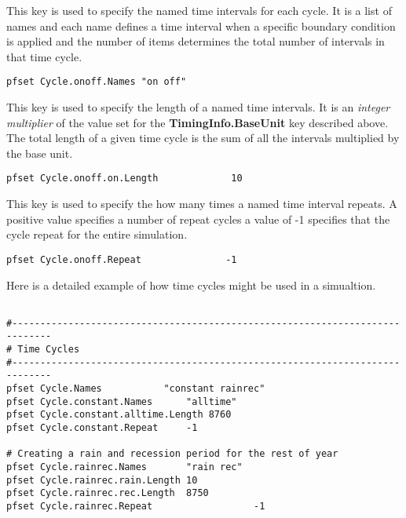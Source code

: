 {
This key is used to specify the named time intervals for each cycle.  It is a list of names and each name defines a time interval when a specific boundary condition is applied and the number of items determines the total number of intervals in that time cycle.
}
\begin{display}\begin{verbatim}
pfset Cycle.onoff.Names "on off"
\end{verbatim}\end{display}

{
This key is used to specify the length of a named time intervals.  It is an {\em integer multiplier} of the value set for the {\bf TimingInfo.BaseUnit} key described above. The total length of a given time cycle is the sum of all the intervals multiplied by the base unit.
}
\begin{display}\begin{verbatim}
pfset Cycle.onoff.on.Length             10
\end{verbatim}\end{display}

{
This key is used to specify the how many times a named time interval repeats.  A positive value specifies a number of repeat cycles a value of -1 specifies that the cycle repeat for the entire simulation.
}
\begin{display}\begin{verbatim}
pfset Cycle.onoff.Repeat               -1
\end{verbatim}\end{display}

Here is a detailed example of how time cycles might be used in a simualtion.
\begin{display}\begin{verbatim}

#-----------------------------------------------------------------------------
# Time Cycles
#-----------------------------------------------------------------------------
pfset Cycle.Names 			"constant rainrec"
pfset Cycle.constant.Names		"alltime"
pfset Cycle.constant.alltime.Length	8760
pfset Cycle.constant.Repeat		-1

# Creating a rain and recession period for the rest of year
pfset Cycle.rainrec.Names		"rain rec"
pfset Cycle.rainrec.rain.Length	10
pfset Cycle.rainrec.rec.Length	8750
pfset Cycle.rainrec.Repeat              	-1
\end{verbatim}\end{display}


